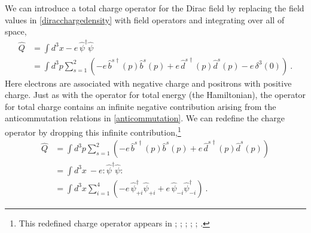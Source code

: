 \documentclass[onecolumn,secnumarabic,amsmath,amssymb,balancelastpage,nofootinbib]{article}
\begin{document}
We can introduce a total charge operator for the Dirac field by replacing the field values in \eqref{diracchargedensity} with field operators and integrating over all of space,
\begin{align}
\widehat{Q}&= \int{d^3 x -e\,\widehat{\psi}^\dagger \widehat{\psi}}
\nonumber
\\
&=\int{d^3 p \sum_{s=1}^2  \left(-e\,\widehat{b}^{s\dagger}(p)\widehat{b}^s(p)+e\,\widehat{d}^{s\dagger}(p)\widehat{d}^{s}(p)-e\, \delta^3(0)\right)}
\ .
\label{badtotalcharge}
\end{align}
Here electrons are associated with negative charge and positrons with positive charge.  Just as with the operator for total energy (the Hamiltonian), the operator for total charge contains an infinite negative contribution arising from the anticommutation relations in \eqref{anticommutation}.  We can redefine the charge operator by dropping this infinite contribution,\footnote{This redefined charge operator appears in \citet[pg.\ 228]{schweberQFT}; \citet[pg.\ 60]{bjorkendrellfields}; \citet[pg.\ 71]{hatfield}; \citet[pg.\ 139]{ryder}; \citet[sec.\ 5.3]{greiner1996}; \citet[pg.\ 52]{duncan}.}
\begin{align}
\widehat{Q}&=\int{d^3 p \sum_{s=1}^2  \left(-e\,\widehat{b}^{s\dagger}(p)\widehat{b}^s(p)+e\,\widehat{d}^{s\dagger}(p)\widehat{d}^{s}(p)\right)}
\nonumber
\\
&=  \int{d^3 x \ -e :\widehat{\psi}^\dagger\widehat{\psi}:}
\nonumber
\\
&=  \int{d^3 x  \sum_{i=1}^4\left(-e\, \widehat{\psi}^{\dagger}_{+i} \widehat{\psi}_{+i}+e\, \widehat{\psi}_{-i}\widehat{\psi}^{\dagger}_{-i}\right)}
\ .
\label{totalcharge}
\end{align}
\end{document}
